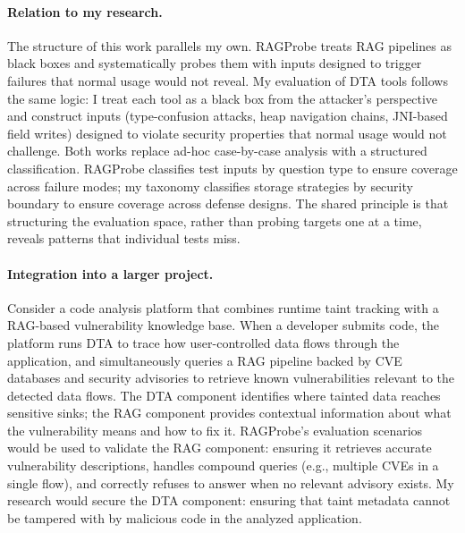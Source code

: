 \documentclass[a4paper,11pt]{article}
\theoremstyle{plain}
\begin{document}
\paragraph{Relation to my research.}
The structure of this work parallels my own. RAGProbe treats RAG pipelines as black boxes and systematically probes them with inputs designed to trigger failures that normal usage would not reveal. My evaluation of DTA tools follows the same logic: I treat each tool as a black box from the attacker's perspective and construct inputs (type-confusion attacks, heap navigation chains, JNI-based field writes) designed to violate security properties that normal usage would not challenge. Both works replace ad-hoc case-by-case analysis with a structured classification. RAGProbe classifies test inputs by question type to ensure coverage across failure modes; my taxonomy classifies storage strategies by security boundary to ensure coverage across defense designs. The shared principle is that structuring the evaluation space, rather than probing targets one at a time, reveals patterns that individual tests miss.

\paragraph{Integration into a larger project.}
Consider a code analysis platform that combines runtime taint tracking with a RAG-based vulnerability knowledge base. When a developer submits code, the platform runs DTA to trace how user-controlled data flows through the application, and simultaneously queries a RAG pipeline backed by CVE databases and security advisories to retrieve known vulnerabilities relevant to the detected data flows. The DTA component identifies where tainted data reaches sensitive sinks; the RAG component provides contextual information about what the vulnerability means and how to fix it. RAGProbe's evaluation scenarios would be used to validate the RAG component: ensuring it retrieves accurate vulnerability descriptions, handles compound queries (e.g., multiple CVEs in a single flow), and correctly refuses to answer when no relevant advisory exists. My research would secure the DTA component: ensuring that taint metadata cannot be tampered with by malicious code in the analyzed application.
\end{document}
